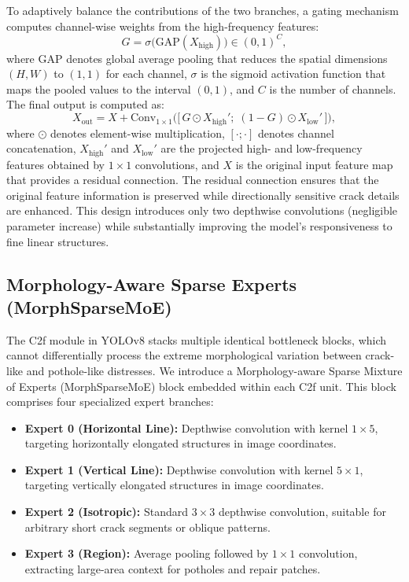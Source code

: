 \documentclass{ieeeaccess}
\begin{document}
To adaptively balance the contributions of the two branches, a gating mechanism computes channel-wise weights from the high-frequency features:
\begin{equation}
G = \sigma\big(\text{GAP}(X_{\text{high}})\big) \in (0,1)^C,
\end{equation}
where $\text{GAP}$ denotes global average pooling that reduces the spatial dimensions $(H, W)$ to $(1, 1)$ for each channel, $\sigma$ is the sigmoid activation function that maps the pooled values to the interval $(0, 1)$, and $C$ is the number of channels. The final output is computed as:
\begin{equation}
X_{\text{out}} = X + \text{Conv}_{1\times1}\Big( \big[\, G \odot X_{\text{high}}';\; (1-G) \odot X_{\text{low}}' \,\big] \Big),
\end{equation}
where $\odot$ denotes element-wise multiplication, $[\cdot;\cdot]$ denotes channel concatenation, $X_{\text{high}}'$ and $X_{\text{low}}'$ are the projected high- and low-frequency features obtained by $1\times1$ convolutions, and $X$ is the original input feature map that provides a residual connection. The residual connection ensures that the original feature information is preserved while directionally sensitive crack details are enhanced. This design introduces only two depthwise convolutions (negligible parameter increase) while substantially improving the model's responsiveness to fine linear structures.

\subsection{Morphology-Aware Sparse Experts (MorphSparseMoE)}

The C2f module in YOLOv8 stacks multiple identical bottleneck blocks, which cannot differentially process the extreme morphological variation between crack-like and pothole-like distresses. We introduce a Morphology-aware Sparse Mixture of Experts (MorphSparseMoE) block embedded within each C2f unit. This block comprises four specialized expert branches:

\begin{itemize}
\item \textbf{Expert 0 (Horizontal Line):} Depthwise convolution with kernel $1\times5$, targeting horizontally elongated structures in image coordinates.
\item \textbf{Expert 1 (Vertical Line):} Depthwise convolution with kernel $5\times1$, targeting vertically elongated structures in image coordinates.
\item \textbf{Expert 2 (Isotropic):} Standard $3\times3$ depthwise convolution, suitable for arbitrary short crack segments or oblique patterns.
\item \textbf{Expert 3 (Region):} Average pooling followed by $1\times1$ convolution, extracting large-area context for potholes and repair patches.
\end{itemize}
\end{document}
